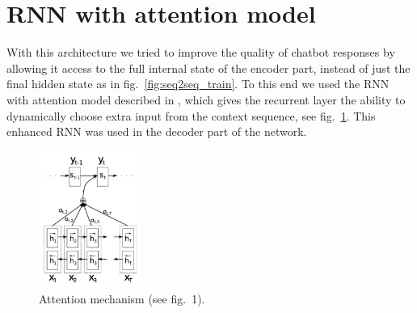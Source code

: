 \documentclass[12pt,a4paper]{article}
\begin{document}
\section{RNN with attention model} %
\label{sec:rnn_with_attention_model}

With this architecture we tried to improve the quality of chatbot responses by
allowing it access to the full internal state of the encoder part, instead of
just the final hidden state as in fig.~\ref{fig:seq2seq_train}. To this end we
used the RNN with attention model described in \cite{2014arXiv14090473B}, which
gives the recurrent layer the ability to dynamically choose extra input from the
context sequence, see fig.~\ref{fig:attn_mech}. This enhanced RNN was used in
the decoder part of the network.

\begin{figure}[b]
    \centering
    \includegraphics[width=0.3\textwidth]{figures/attn_mechanism.png}
    \caption{Attention mechanism (see \cite{2014arXiv14090473B} fig.~1).}
    \label{fig:attn_mech}
\end{figure}
\end{document}
